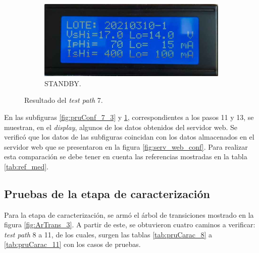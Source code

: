 \begin{figure}[!htpb]
           \hfill
     \begin{subfigure}[b]{0.4\textwidth}
         \centering
         \includegraphics[width=1.1\textwidth]{./Figures/pru_fail.jpeg}
         \caption{STANDBY.}
         \label{fig:pruConf_7_4}
     \end{subfigure}
        \caption{Resultado del \textit{test path} 7.}
        \label{fig:pruConf_7_res}
\end{figure}

En las subfiguras \ref{fig:pruConf_7_3} y \ref{fig:pruConf_7_4}, correspondientes a los pasos 11 y 13, se muestran, en el \textit{display}, algunos de los datos obtenidos del servidor web. Se verificó que los datos de las subfiguras coincidan con los datos almacenados en el servidor web que se presentaron en la figura \ref{fig:serv_web_conf}. Para realizar esta comparación se debe tener en cuenta las referencias mostradas en la tabla \ref{tab:ref_med}.

\subsection{Pruebas de la etapa de caracterización}

Para la etapa de caracterización, se armó el árbol de transiciones mostrado en la figura \ref{fig:ArTrans_3}. A partir de este, se obtuvieron cuatro caminos a verificar: \textit{test path} 8 a 11, de los cuales, surgen las tablas \ref{tab:pruCarac_8} a \ref{tab:pruCarac_11} con los casos de pruebas.

